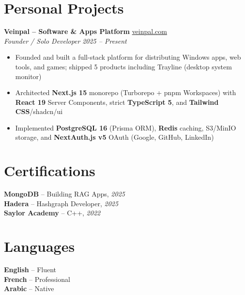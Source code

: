 \documentclass[10pt,a4paper]{article}
\begin{document}
\vspace{4pt}
\section*{Personal Projects}
{\small
\textbf{Veinpal -- Software \& Apps Platform} \hfill \href{https://veinpal.com}{veinpal.com}\\[1pt]
\textit{Founder / Solo Developer} \hfill \textit{2025 -- Present}
\begin{itemize}
  \item Founded and built a full-stack platform for distributing Windows apps, web tools, and games; shipped 5 products including Trayline (desktop system monitor)
  \item Architected \textbf{Next.js 15} monorepo (Turborepo + pnpm Workspaces) with \textbf{React 19} Server Components, strict \textbf{TypeScript 5}, and \textbf{Tailwind CSS}/shadcn/ui
  \item Implemented \textbf{PostgreSQL 16} (Prisma ORM), \textbf{Redis} caching, S3/MinIO storage, and \textbf{NextAuth.js v5} OAuth (Google, GitHub, LinkedIn)
\end{itemize}


}

\vspace{3pt}
\section*{Certifications}
{\small
\textbf{MongoDB} -- Building RAG Apps, \textit{2025}\\[1pt]
\textbf{Hadera} -- Hashgraph Developer, \textit{2025}\\[1pt]
\textbf{Saylor Academy} -- C++, \textit{2022}
}

\section*{Languages}
{\small
\textbf{English} -- Fluent\\[1pt]
\textbf{French} -- Professional\\[1pt]
\textbf{Arabic} -- Native
}
\end{document}
